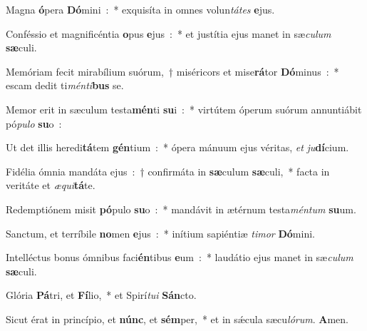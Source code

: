 ﻿\item Magna \textbf{ó}\-pera \textbf{Dó}\-mini~:~* exquisíta in omnes volun\emph{tá}\-\emph{tes} \textbf{e}jus.
\item Conféssio et magnificéntia \textbf{o}\-pus \textbf{e}jus~:~* et justítia ejus manet in sæ\emph{cu}\-\emph{lum} \textbf{sæ}culi.
\item Memóriam fecit mirabílium suórum,~† miséricors et mise\textbf{rá}\-tor \textbf{Dó}\-minus~:~* escam dedit ti\emph{mén}\-\emph{ti}\-\textbf{bus} se.
\item Memor erit in sæculum testa\textbf{mén}\-ti \textbf{su}\-i~:~* virtútem óperum suórum annuntiábit pó\emph{pu}\-\emph{lo} \textbf{su}o~:
\item Ut det illis heredi\textbf{tá}\-tem \textbf{gén}\-tium~:~* ópera mánuum ejus véritas, \emph{et} \emph{ju}\textbf{dí}cium.
\item Fidélia ómnia mandáta ejus~:~† confirmáta in \textbf{sæ}\-culum \textbf{sæ}\-culi,~* facta in veritáte et \emph{æ}\emph{qui}\textbf{tá}te.
\item Redemptiónem misit \textbf{pó}\-pulo \textbf{su}\-o~:~* mandávit in ætérnum testa\emph{mén}\-\emph{tum} \textbf{su}um.
\item Sanctum, et terríbile \textbf{no}\-men \textbf{e}jus~:~* inítium sapiéntiæ \emph{ti}\-\emph{mor} \textbf{Dó}mini.
\item Intelléctus bonus ómnibus faci\textbf{én}\-tibus \textbf{e}\-um~:~* laudátio ejus manet in sæ\emph{cu}\-\emph{lum} \textbf{sæ}culi.
\item Glória \textbf{Pá}\-tri, et \textbf{Fí}\-lio,~* et Spirí\emph{tu}\-\emph{i} \textbf{Sán}cto.
\item Sicut érat in princípio, et \textbf{núnc}, et \textbf{sém}\-per,~* et in sǽcula sæcu\emph{ló}\-\emph{rum}. \textbf{A}men.